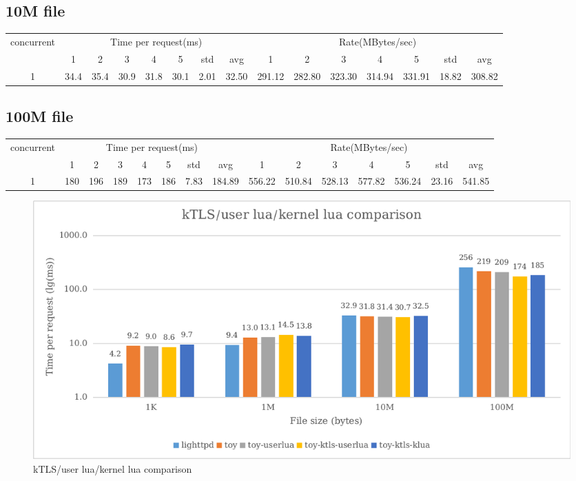 \documentclass{article}
\begin{document}
\subsection*{10M file}
\begin{table}[H]
    \begin{tabular}{|c|c|c|c|c|c|c|c|c|c|c|c|c|c|c|}
        \hline
        \multirow{2}{*}{concurrent} & \multicolumn{7}{c|}{Time per request(ms)} & \multicolumn{7}{c|}{Rate(MBytes/sec)}                                                                                                   \\ \cline{2-15}
                                    & 1                                         & 2                                     & 3    & 4    & 5    & std  & avg   & 1      & 2      & 3      & 4      & 5      & std   & avg    \\ \hline
        1                           & 34.4                                      & 35.4                                  & 30.9 & 31.8 & 30.1 & 2.01 & 32.50 & 291.12 & 282.80 & 323.30 & 314.94 & 331.91 & 18.82 & 308.82 \\ \hline
    \end{tabular}
\end{table}
\subsection*{100M file}
\begin{table}[H]
    \begin{tabular}{|c|c|c|c|c|c|c|c|c|c|c|c|c|c|c|}
        \hline
        \multirow{2}{*}{concurrent} & \multicolumn{7}{c|}{Time per request(ms)} & \multicolumn{7}{c|}{Rate(MBytes/sec)}                                                                                                 \\ \cline{2-15}
                                    & 1                                         & 2                                     & 3   & 4   & 5   & std  & avg    & 1      & 2      & 3      & 4      & 5      & std   & avg    \\ \hline
        1                           & 180                                       & 196                                   & 189 & 173 & 186 & 7.83 & 184.89 & 556.22 & 510.84 & 528.13 & 577.82 & 536.24 & 23.16 & 541.85 \\ \hline
    \end{tabular}
\end{table}
\begin{figure}[H]
    \centering
    \includegraphics[scale=0.85]{pic/p3.png}
    \caption{kTLS/user lua/kernel lua comparison}
\end{figure}
\end{document}
